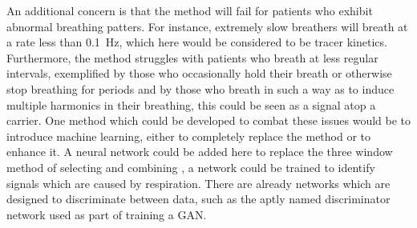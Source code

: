             An additional concern is that the method will fail for patients who exhibit abnormal breathing patters. For instance, extremely slow breathers will breath at a rate less than \SI{0.1}{\hertz}, which here would be considered to be tracer kinetics. Furthermore, the method struggles with patients who breath at less regular intervals, exemplified by those who occasionally hold their breath or otherwise stop breathing for periods and by those who breath in such a way as to induce multiple harmonics in their breathing, this could be seen as a signal atop a carrier. One method which could be developed to combat these issues would be to introduce machine learning, either to completely replace the method or to enhance it. A neural network could be added here to replace the three window method of selecting and combining , a network could be trained to identify signals which are caused by respiration. There are already networks which are designed to discriminate between data, such as the aptly named discriminator network used as part of training a \gls{GAN}. 
    
        
        
            
        
            
            
            
            
            
